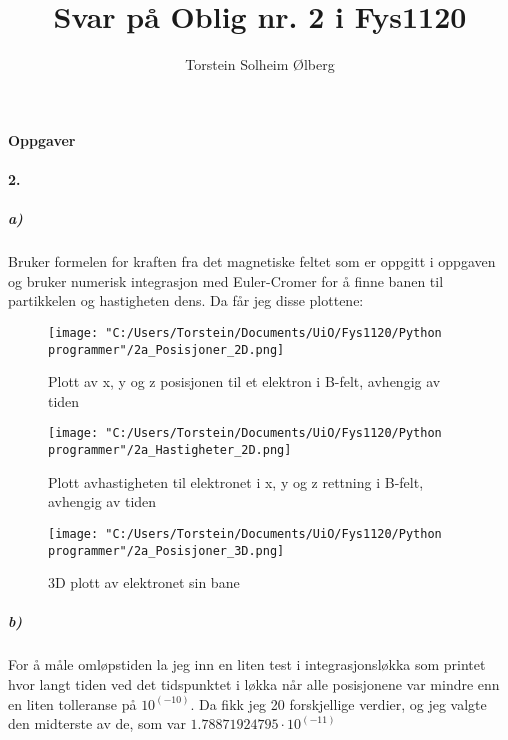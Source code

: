 \documentclass[11pt, A4paper,norsk]{article}
\author{Torstein Solheim Ølberg}
\title{Svar på Oblig nr. 2 i Fys1120}
\begin{document}
	\maketitle
	\begin{center}
		\Large \textbf{Oppgaver}
	\end{center}
	
	
	
	
	
	
	
	
	
		\paragraph{2.}
			\subparagraph{a)}
				\begin{flushleft}
Bruker formelen for kraften fra det magnetiske feltet som er oppgitt i oppgaven og bruker numerisk integrasjon med Euler-Cromer for å finne banen til partikkelen og hastigheten dens. Da får jeg disse plottene:
				\end{flushleft}
					\begin{figure}
\texttt{[image: "C:/Users/Torstein/Documents/UiO/Fys1120/Python programmer"/2a\_Posisjoner\_2D.png]}
\caption{Plott av x, y og z posisjonen til et elektron i B-felt, avhengig av tiden}
					\end{figure}
					\begin{figure}
\texttt{[image: "C:/Users/Torstein/Documents/UiO/Fys1120/Python programmer"/2a\_Hastigheter\_2D.png]}
\caption{Plott avhastigheten til elektronet i x, y og z rettning i B-felt, avhengig av tiden}
					\end{figure}
					\begin{figure}
\texttt{[image: "C:/Users/Torstein/Documents/UiO/Fys1120/Python programmer"/2a\_Posisjoner\_3D.png]}
\caption{3D plott av elektronet sin bane}
					\end{figure}
\clearpage






			\subparagraph{b)}
				\begin{flushleft}
For å måle omløpstiden la jeg inn en liten test i integrasjonsløkka som printet hvor langt tiden ved det tidspunktet i løkka når alle posisjonene var mindre enn en liten tolleranse på $10^(-10)$. Da fikk jeg 20 forskjellige verdier, og jeg valgte den midterste av de, som var $1.78871924795 \cdot 10^(-11)$
				\end{flushleft}
	
\end{document}
